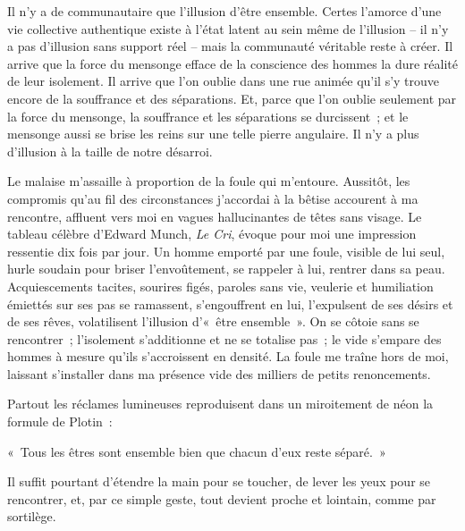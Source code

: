 \documentclass[french,twoside]{book} %
\newcommand{\astermono}{\medskip\centerline{\color{rubric}\large\selectfont{\syms ✻}}\medskip\par}%
\newenvironment{quoteblock}%
  {\begin{quoting}}
  {\end{quoting}}
\newenvironment{quotebar}{%
    \def\FrameCommand{{\color{rubric!10!}\vrule width 0.5em} \hspace{0.9em}}%
    \def\OuterFrameSep{\itemsep} %
    \MakeFramed {\advance\hsize-\width \FrameRestore}
  }%
  {%
    \endMakeFramed
  }
\renewenvironment{quoteblock}%
  {%
    \savenotes
    \setstretch{0.9}
    \normalfont
    \begin{quotebar}
  }
  {%
    \end{quotebar}
    \spewnotes
  }
\begin{document}
Il n’y a de communautaire que l’illusion d’être ensemble. Certes l’amorce d’une vie collective authentique existe à l’état latent au sein même de l’illusion – il n’y a pas d’illusion sans support réel – mais la communauté véritable reste à créer. Il arrive que la force du mensonge efface de la conscience des hommes la dure réalité de leur isolement. Il arrive que l’on oublie dans une rue animée qu’il s’y trouve encore de la souffrance et des séparations. Et, parce que l’on oublie seulement par la force du mensonge, la souffrance et les séparations se durcissent ; et le mensonge aussi se brise les reins sur une telle pierre angulaire. Il n’y a plus d’illusion à la taille de notre désarroi.\par
Le malaise m’assaille à proportion de la foule qui m’entoure. Aussitôt, les compromis qu’au fil des circonstances j’accordai à la bêtise accourent à ma rencontre, affluent vers moi en vagues hallucinantes de têtes sans visage. Le tableau célèbre d’Edward Munch, \emph{Le Cri}, évoque pour moi une impression ressentie dix fois par jour. Un homme emporté par une foule, visible de lui seul, hurle soudain pour briser l’envoûtement, se rappeler à lui, rentrer dans sa peau. Acquiescements tacites, sourires figés, paroles sans vie, veulerie et humiliation émiettés sur ses pas se ramassent, s’engouffrent en lui, l’expulsent de ses désirs et de ses rêves, volatilisent l’illusion d’« être ensemble ». On se côtoie sans se rencontrer ; l’isolement s’additionne et ne se totalise pas ; le vide s’empare des hommes à mesure qu’ils s’accroissent en densité. La foule me traîne hors de moi, laissant s’installer dans ma présence vide des milliers de petits renoncements.\par
Partout les réclames lumineuses reproduisent dans un miroitement de néon la formule de Plotin :\par

\begin{quoteblock}
\noindent « Tous les êtres sont ensemble bien que chacun d’eux reste séparé. »\end{quoteblock}

\noindent Il suffit pourtant d’étendre la main pour se toucher, de lever les yeux pour se rencontrer, et, par ce simple geste, tout devient proche et lointain, comme par sortilège.\par

\astermono
\end{document}
